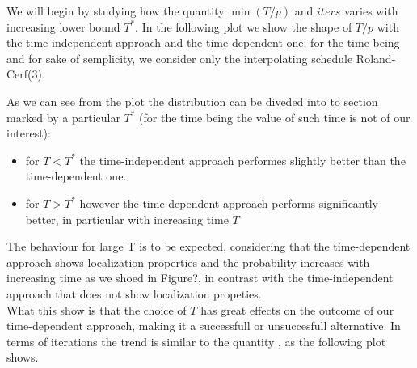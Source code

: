          We will begin by studying how the quantity $\min(T/p)$ and $iters$ varies with increasing lower bound $T^*$.
         In the following plot we show the shape of $T/p$ with the time-independent approach and the time-dependent one; for the time being and for sake of semplicity, we consider only the interpolating schedule Roland-Cerf(3).


        As we can see from the plot the distribution can be diveded into to section marked by a particular $T^*$ (for the time being the value of such time is not of our interest):
        \begin{itemize}
            \item for $T<T^*$ the time-independent approach performes slightly better than the time-dependent one.
            \item for $T>T^*$ however the time-dependent approach performs significantly better, in particular with increasing time $T$
        \end{itemize}
        The behaviour for large T is to be expected, considering that the time-dependent approach shows localization properties and the probability increases with increasing time as we shoed in Figure?, in contrast with the time-independent approach that does not show localization propeties.\\ What this show is that the choice of $T$ has great effects on the outcome of our time-dependent approach, making it a successfull or unsuccesfull alternative.
        In terms of iterations the trend is similar to the quantity \quantity, as the following plot shows.


